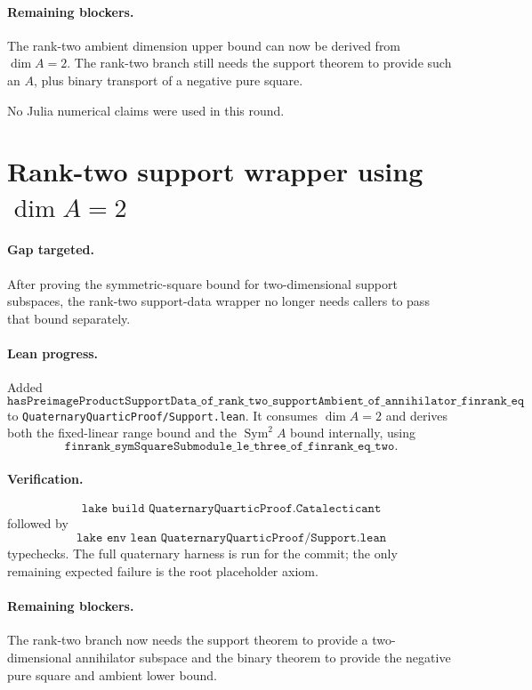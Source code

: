 \documentclass[11pt]{article}
\begin{document}
\paragraph{Remaining blockers.}
The rank-two ambient dimension upper bound can now be derived from
\(\dim A=2\).  The rank-two branch still needs the support theorem to provide
such an \(A\), plus binary transport of a negative pure square.

No Julia numerical claims were used in this round.

\section*{Rank-two support wrapper using \texorpdfstring{\(\dim A=2\)}{dim A=2}}

\paragraph{Gap targeted.}
After proving the symmetric-square bound for two-dimensional support
subspaces, the rank-two support-data wrapper no longer needs callers to pass
that bound separately.

\paragraph{Lean progress.}
Added
\[
\texttt{hasPreimageProductSupportData\_of\_rank\_two\_supportAmbient\_of\_annihilator\_finrank\_eq}
\]
to \texttt{QuaternaryQuarticProof/Support.lean}.  It consumes
\(\dim A=2\) and derives both the fixed-linear range bound and the
\(\operatorname{Sym}^2A\) bound internally, using
\[
\texttt{finrank\_symSquareSubmodule\_le\_three\_of\_finrank\_eq\_two}.
\]

\paragraph{Verification.}
\[
\texttt{lake build QuaternaryQuarticProof.Catalecticant}
\]
followed by
\[
\texttt{lake env lean QuaternaryQuarticProof/Support.lean}
\]
typechecks.  The full quaternary harness is run for the commit; the only
remaining expected failure is the root placeholder axiom.

\paragraph{Remaining blockers.}
The rank-two branch now needs the support theorem to provide a
two-dimensional annihilator subspace and the binary theorem to provide the
negative pure square and ambient lower bound.
\end{document}

